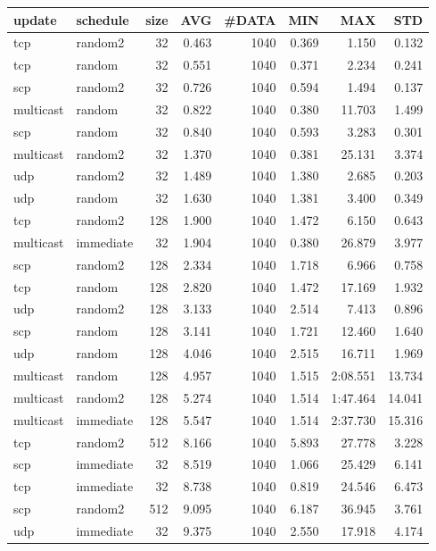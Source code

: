 \begin{tabular}{|llrrrrrr|}
\hline
{\sc update}&{\sc schedule}&{\sc size}&{\sc AVG}&{\sc\#DATA}&{\sc MIN}&{\sc MAX}&{\sc STD}\\
\hline
tcp & random2 & 32 &  0.463 & 1040 & 0.369 & 1.150 & 0.132\\
tcp & random & 32 &  0.551 & 1040 & 0.371 & 2.234 & 0.241\\
scp & random2 & 32 &  0.726 & 1040 & 0.594 & 1.494 & 0.137\\
multicast & random & 32 &  0.822 & 1040 & 0.380 & 11.703 & 1.499\\
scp & random & 32 &  0.840 & 1040 & 0.593 & 3.283 & 0.301\\
multicast & random2 & 32 &  1.370 & 1040 & 0.381 & 25.131 & 3.374\\
udp & random2 & 32 &  1.489 & 1040 & 1.380 & 2.685 & 0.203\\
udp & random & 32 &  1.630 & 1040 & 1.381 & 3.400 & 0.349\\
tcp & random2 & 128 &  1.900 & 1040 & 1.472 & 6.150 & 0.643\\
multicast & immediate & 32 &  1.904 & 1040 & 0.380 & 26.879 & 3.977\\
scp & random2 & 128 &  2.334 & 1040 & 1.718 & 6.966 & 0.758\\
tcp & random & 128 &  2.820 & 1040 & 1.472 & 17.169 & 1.932\\
udp & random2 & 128 &  3.133 & 1040 & 2.514 & 7.413 & 0.896\\
scp & random & 128 &  3.141 & 1040 & 1.721 & 12.460 & 1.640\\
udp & random & 128 &  4.046 & 1040 & 2.515 & 16.711 & 1.969\\
multicast & random & 128 &  4.957 & 1040 & 1.515 & 2:08.551 & 13.734\\
multicast & random2 & 128 &  5.274 & 1040 & 1.514 & 1:47.464 & 14.041\\
multicast & immediate & 128 &  5.547 & 1040 & 1.514 & 2:37.730 & 15.316\\
tcp & random2 & 512 &  8.166 & 1040 & 5.893 & 27.778 & 3.228\\
scp & immediate & 32 &  8.519 & 1040 & 1.066 & 25.429 & 6.141\\
tcp & immediate & 32 &  8.738 & 1040 & 0.819 & 24.546 & 6.473\\
scp & random2 & 512 &  9.095 & 1040 & 6.187 & 36.945 & 3.761\\
udp & immediate & 32 &  9.375 & 1040 & 2.550 & 17.918 & 4.174\\

\end{tabular}
